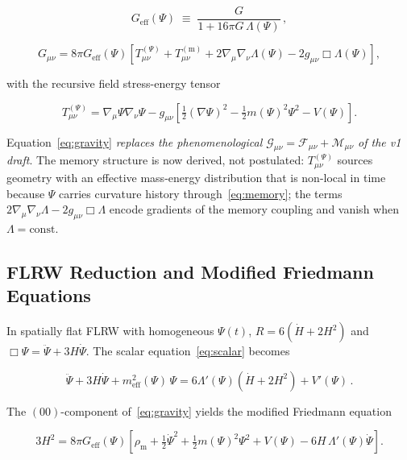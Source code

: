 \documentclass[12pt,a4paper]{article}
\begin{document}
\begin{equation}
\label{eq:Geff_def}
G_{\mathrm{eff}}(\Psi) \;\equiv\; \frac{G}{1 + 16\pi G\,\Lambda(\Psi)}\,,
\end{equation}

\begin{equation}
\label{eq:gravity}
\boxed{
G_{\mu\nu} = 8\pi G_{\mathrm{eff}}(\Psi)
\!\left[
  T^{(\Psi)}_{\mu\nu} + T^{(\mathrm{m})}_{\mu\nu}
  + 2\nabla_\mu\nabla_\nu\Lambda(\Psi)
  - 2g_{\mu\nu}\Box\Lambda(\Psi)
\right],
}
\end{equation}

with the recursive field stress-energy tensor

\begin{equation}
\label{eq:Tpsi}
T^{(\Psi)}_{\mu\nu}
= \nabla_\mu\Psi\nabla_\nu\Psi
  - g_{\mu\nu}\!\left[
    \tfrac{1}{2}(\nabla\Psi)^2
    - \tfrac{1}{2}m(\Psi)^2\Psi^2 - V(\Psi)
  \right].
\end{equation}

Equation~\eqref{eq:gravity} \emph{replaces the phenomenological
$\mathcal{G}_{\mu\nu} = \mathcal{F}_{\mu\nu} + \mathcal{M}_{\mu\nu}$
of the v1 draft}. The memory structure is now derived, not postulated:
$T^{(\Psi)}_{\mu\nu}$ sources geometry with an effective mass-energy
distribution that is non-local in time because $\Psi$ carries curvature
history through~\eqref{eq:memory}; the terms
$2\nabla_\mu\nabla_\nu\Lambda - 2g_{\mu\nu}\Box\Lambda$ encode gradients
of the memory coupling and vanish when $\Lambda = \mathrm{const}$.

\subsection{FLRW Reduction and Modified Friedmann Equations}
\label{sec:flrw}

In spatially flat FLRW with homogeneous $\Psi(t)$,
$R = 6(\dot{H} + 2H^2)$ and $\Box\Psi = \ddot\Psi + 3H\dot\Psi$.
The scalar equation~\eqref{eq:scalar} becomes

\begin{equation}
\label{eq:flrw_scalar}
\ddot\Psi + 3H\dot\Psi + m_{\mathrm{eff}}^2(\Psi)\,\Psi
= 6\Lambda'(\Psi)\!\left(\dot{H} + 2H^2\right) + V'(\Psi)\,.
\end{equation}

The $(00)$-component of~\eqref{eq:gravity} yields the modified Friedmann equation

\begin{equation}
\label{eq:friedmann}
\boxed{
3H^2 = 8\pi G_{\mathrm{eff}}(\Psi)
\!\left[
  \rho_{\mathrm{m}}
  + \tfrac{1}{2}\dot\Psi^2
  + \tfrac{1}{2}m(\Psi)^2\Psi^2
  + V(\Psi)
  - 6H\,\Lambda'(\Psi)\dot\Psi
\right].
}
\end{equation}
\end{document}
